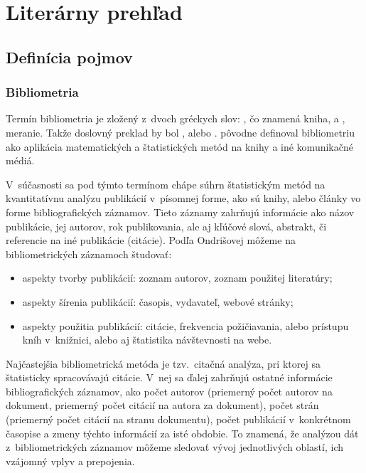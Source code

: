 \chapter{Literárny prehľad}
\label{chap:review}

\section{Definícia pojmov}

\subsection{Bibliometria}

Termín bibliometria je zložený z~dvoch gréckych slov:
, čo znamená kniha, a
, meranie.  Takže doslovný
preklad by bol , alebo .
\citet{Pritchard1969} pôvodne definoval bibliometriu ako aplikácia matematických
a štatistických metód na knihy a iné komunikačné médiá.

V~súčasnosti sa pod týmto termínom chápe súhrn štatistickým metód na
kvantitatívnu analýzu publikácií v~písomnej forme, ako sú knihy, alebo články vo
forme bibliografických záznamov.  Tieto záznamy zahrňujú informácie ako názov
publikácie, jej autorov, rok publikovania, ale aj kľúčové slová, abstrakt, či
referencie na iné publikácie (citácie).  Podľa Ondrišovej
\citeyearpar{Ondrisova2011} môžeme na bibliometrických záznamoch študovať:

\begin{itemize}
\item aspekty tvorby publikácií: zoznam autorov, zoznam použitej literatúry;
\item aspekty šírenia publikácií: časopis, vydavateľ, webové stránky;
\item aspekty použitia publikácií: citácie, frekvencia požičiavania, alebo
  prístupu kníh v~knižnici, alebo aj štatistika návštevnosti na webe.

\end{itemize}

Najčastejšia bibliometrická metóda je tzv.~citačná analýza, pri ktorej sa štatisticky spracovávajú citácie.  V~nej sa ďalej
zahrňujú ostatné informácie bibliografických záznamov, ako počet autorov
(priemerný počet autorov na dokument, priemerný počet citácií na autora za
dokument), počet strán (priemerný počet citácií na stranu dokumentu), počet
publikácií v~konkrétnom časopise a zmeny týchto informácií za isté obdobie.  To
znamená, že analýzou dát z~bibliometrických záznamov môžeme sledovať vývoj
jednotlivých oblastí, ich vzájomný vplyv a prepojenia.

